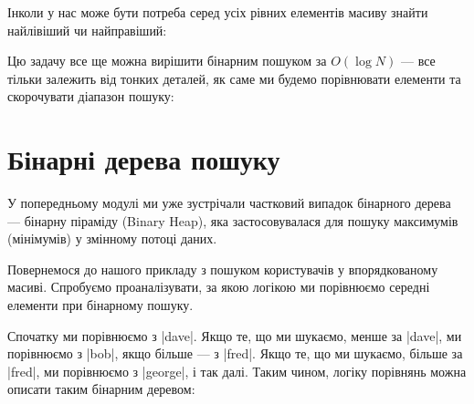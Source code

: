 \documentclass[12pt,a4paper]{report}
\begin{document}
Інколи у нас може бути потреба серед усіх рівних елементів масиву знайти найлівіший чи найправіший:

\begin{center}
\end{center}

Цю задачу все ще можна вирішити бінарним пошуком за \(O(\log N)\) --- все тільки залежить від тонких деталей, як саме ми будемо порівнювати елементи та скорочувати діапазон пошуку:





\section{Бінарні дерева пошуку}

У попередньому модулі ми уже зустрічали частковий випадок бінарного дерева --- бінарну піраміду (Binary Heap), яка застосовувалася для пошуку максимумів (мінімумів) у змінному потоці даних.

Повернемося до нашого прикладу з пошуком користувачів у впорядкованому масиві. Спробуємо проаналізувати, за якою логікою ми порівнюємо середні елементи при бінарному пошуку.

Спочатку ми порівнюємо з |dave|. Якщо те, що ми шукаємо, менше за |dave|, ми порівнюємо з |bob|, якщо більше --- з |fred|. Якщо те, що ми шукаємо, більше за |fred|, ми порівнюємо з |george|, і так далі. Таким чином, логіку порівнянь можна описати таким бінарним деревом:
\end{document}
